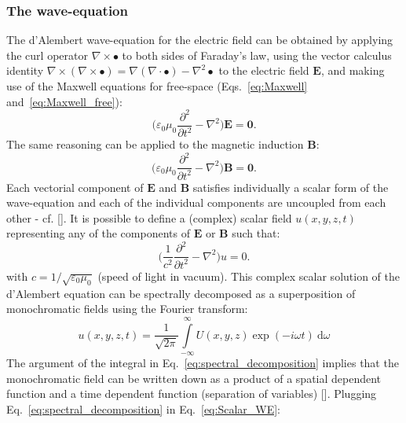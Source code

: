 \begin{refsection}
\subsubsection*{The wave-equation}

The d'Alembert wave-equation for the electric field can be obtained by applying the curl operator $\nabla\times\bullet$ to both sides of Faraday's law, using the vector calculus identity $\nabla\times(\nabla\times\bullet)=\nabla(\nabla\cdot\bullet)-\nabla^2\bullet$ to the electric field $\textbf{E}$, and making use of the Maxwell equations for free-space (Eqs.~\ref{eq:Maxwell} and~\ref{eq:Maxwell_free}):
\begin{equation}\label{eq:Evectorial_waveeq}
    \Bigg(\varepsilon_0\mu_0\frac{\partial^2}{\partial t^2} - \nabla^2\Bigg)\textbf{E}=\textbf{0}.
\end{equation}
 The same reasoning can be applied to the magnetic induction $\textbf{B}$:
\begin{equation}\label{eq:Bvectorial_waveeq}
    \Bigg(\varepsilon_0\mu_0\frac{\partial^2}{\partial t^2} - \nabla^2\Bigg)\textbf{B}=\textbf{0}.
\end{equation}
Each vectorial component of $\textbf{E}$ and $\textbf{B}$ satisfies individually a scalar form of the wave-equation and each of the individual components are uncoupled from each other - cf. [\cite[\textit{§1.1}]{Paganin2006}]. It is possible to define a (complex) scalar field $u(x,y,z,t)$ representing any of the components of $\textbf{E}$ or $\textbf{B}$ such that:
\begin{equation}\label{eq:Scalar_WE}
    \Bigg(\frac{1}{c^2}\frac{\partial^2}{\partial t^2} - \nabla^2\Bigg)u=0.
\end{equation}
with $c=1/\sqrt{\varepsilon_0\mu_0}$ (speed of light in vacuum). This complex scalar solution of the d'Alembert equation can be spectrally decomposed as a superposition of monochromatic fields using the Fourier transform:
\begin{equation}\label{eq:spectral_decomposition}
    u(x,y,z,t)=\frac{1}{\sqrt{2\pi}}\int\limits_{-\infty}^\infty{U(x,y,z)\exp{(-i\omega t)}~\mathrm{d}\omega}
\end{equation}
The argument of the integral in Eq.~\ref{eq:spectral_decomposition} implies that the monochromatic field can be written down as a product of a spatial dependent function and a time dependent function (separation of variables) [\cite[\textit{§1.2}]{Paganin2006}]. Plugging Eq.~\ref{eq:spectral_decomposition} in Eq.~\ref{eq:Scalar_WE}:

\end{refsection}
